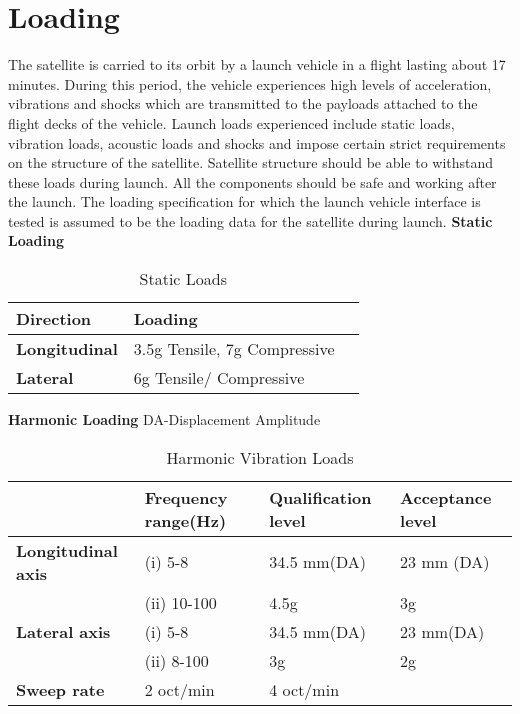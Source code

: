 \documentclass[../../main.tex]{subfiles}
\begin{document}
\section{Loading}
The satellite is carried to its orbit by a launch vehicle in a flight lasting about 17 minutes.
During this period, the vehicle experiences high levels of acceleration, vibrations and
shocks which are transmitted to the payloads attached to the flight decks of the vehicle.
Launch loads experienced include static loads, vibration loads, acoustic loads and shocks
and impose certain strict requirements on the structure of the satellite. Satellite structure
should be able to withstand these loads during launch. All the components should be
safe and working after the launch. The loading specification for which the launch vehicle
interface is tested is assumed to be the loading data for the satellite during launch. \newline
\newline
    \textbf{Static Loading}

\begin{table}[H]
    \centering
    \begin{tabular}{ |p{3cm} | p{6cm} | p{3cm} | }
    \hline
    \textbf{Direction} & \textbf{Loading} \\
    \hline
    \textbf{Longitudinal} & 3.5g Tensile, 7g Compressive \\
    \hline
    \textbf{Lateral} & 6g Tensile/ Compressive \\
    \hline
    \end{tabular}
    \caption{Static Loads}
    \label{tab:my_label}
\end{table}

\textbf{Harmonic Loading}
\newline
DA-Displacement Amplitude
\begin{table}[H]
    \centering
    \begin{tabular}{ |p{3.5cm}|p{3.5cm}|p{3.3cm}|p{3.3cm}| }
 \hline
     & \textbf{Frequency range(Hz)} & \textbf{Qualification level} &\textbf{Acceptance level} \\
     \hline
\textbf{Longitudinal axis} & (i) 5-8 & 34.5 mm(DA)  & 23 mm (DA) \\
     \hline
 & (ii) 10-100 & 4.5g & 3g \\
 \hline
 \textbf{Lateral axis} & (i) 5-8 & 34.5 mm(DA) & 23 mm(DA) \\
 \hline
 & (ii) 8-100 & 3g & 2g \\
 \hline
\textbf{Sweep rate} & 2 oct/min & 4 oct/min &  \\
 \hline
 \end{tabular}
    \caption{Harmonic Vibration Loads}
    \label{tab:my_label}
\end{table}
\end{document}

